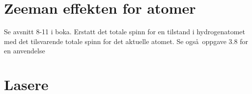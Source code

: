 \section{Zeeman effekten for atomer}
Se avsnitt 8-11 i boka. Erstatt det  
totale spinn for en tilstand
i hydrogenatomet med det tilsvarende
totale spinn for det aktuelle atomet. Se ogs\aa\ oppgave 3.8 for en anvendelse


\section{Lasere}


